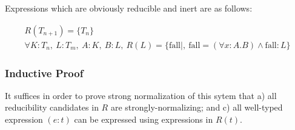 \documentclass[11pt]{article}
\begin{document}
Expressions which are obviously reducible and inert are as follows:

\begin{gather*}
R(T_{n + 1}) = \{ T_{n} \}\ \\
\forall K : T_{n},\ L : T_{m},\ A : K,\ B : L,\ R(L) = \{ \text{fall} \mid ,\ \text{fall} = (\forall x : A.B) \land \text{fall} : L \}
\end{gather*}
\subsubsection{Inductive Proof}
\label{sec:orgfd7b293}

It suffices in order to prove strong normalization of this sytem that a) all reducibility candidates in \(R\) are strongly-normalizing; and c) all well-typed expression \((e : t)\) can be expressed using expressions in \(R(t)\).
\end{document}
